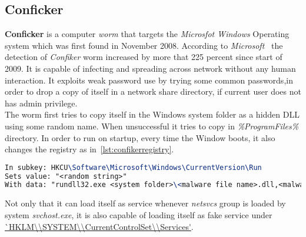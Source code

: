 \subsection{Conficker}
\label{sub:Conficker}
\textbf{Conficker} is a computer \emph{worm} that targets the \emph{Microsfot Windows} Operating system which was first found in November 2008.
According to \emph{Microsoft}~\cite[Worm:Win32/Conficker.B]{conficker} the detection of \emph{Confiker} worm increased by more that 225 percent since start of 2009.
It is capable of infecting and spreading across network without any human interaction.
It exploits weak password use by trying some common passwords,in order to drop a copy of itself in a network share directory, if current user does not has admin privilege.\\
The worm first tries to copy itself in the Windows system folder as a hidden DLL using some random name. When unsuccessful it tries to copy in \emph{\%ProgramFiles\%} directory.
In order to run on startup, every time the Window boots, it also changes the registry as in~\autoref{lst:confikerregistry}.
\begin{lstlisting}[language=TeX,caption={Registry key created by Confiker worm for autostart},label={lst:confikerregistry}]
In subkey: HKCU\Software\Microsoft\Windows\CurrentVersion\Run
Sets value: "<random string>"
With data: "rundll32.exe <system folder>\<malware file name>.dll,<malware parameters>"
\end{lstlisting}
Not only that it can load itself as service whenever \emph{netsvcs} group is loaded by system \emph{svchost.exe},
it is also capable of loading itself as fake service under \url{`HKLM\\SYSTEM\\CurrentControlSet\\Services'}.
